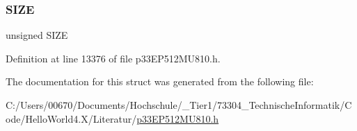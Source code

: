 \subsubsection{\texorpdfstring{S\+I\+ZE}{SIZE}}
{\footnotesize\ttfamily unsigned S\+I\+ZE}



Definition at line 13376 of file p33\+E\+P512\+M\+U810.\+h.



The documentation for this struct was generated from the following file\+:\begin{DoxyCompactItemize}
\item 
C\+:/\+Users/00670/\+Documents/\+Hochschule/\+\_\+\+Tier1/73304\+\_\+\+Technische\+Informatik/\+Code/\+Hello\+World4.\+X/\+Literatur/\hyperlink{p33_e_p512_m_u810_8h}{p33\+E\+P512\+M\+U810.\+h}\end{DoxyCompactItemize}
